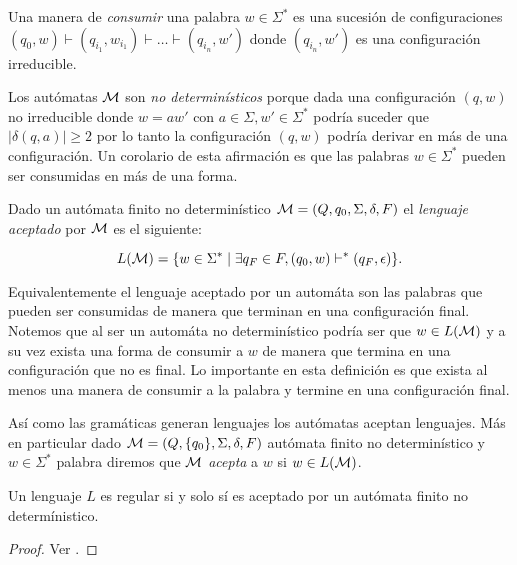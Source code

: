 \documentclass[tesis.tex]{subfiles}
\begin{document}
Una manera de \emph{consumir} una palabra $w \in \Sigma^*$ es una sucesión de configuraciones $(q_0,w) \vdash (q_{i_{1}}, w_{i_{1}}) \vdash \dots \vdash (q_{i_{n}}, w')$ donde $(q_{i_{n}}, w')$ es una configuración irreducible.

\begin{obs}
	Los autómatas $\cal M$ son \emph{no determinísticos} porque dada una configuración $(q,w)$ no irreducible donde $w = aw'$ con $a \in \Sigma, w' \in \Sigma^*$ podría suceder que $|\delta(q,a)| \ge 2$ por lo tanto la configuración $(q,w)$ podría derivar en más de una configuración.
	Un corolario de esta afirmación es que las palabras $w \in \Sigma^*$ pueden ser consumidas en más de una forma.
\end{obs}



\begin{deff}
	Dado un autómata finito no determinístico ${\cal M} = (Q,q_0,\Sigma,\delta,F)$ el \emph{lenguaje aceptado} por $\cal M$ es el siguiente:
	
	\[
	L({\cal M} ) = \{  w \in \Sigma^*\mid \exists  q_F \in F  ,  (q_0,w) \vdash^* (q_F,\epsilon)     \}.
	\]
\end{deff}
Equivalentemente el lenguaje aceptado por un automáta son las palabras que pueden ser 
consumidas de manera que terminan en una configuración final.
Notemos que al ser un automáta no determinístico podría ser que $w \in L(\cal M)$ y a su vez exista una forma de consumir a $w$ de manera que termina en una configuración que no es final.
Lo importante en esta definición es que exista al menos una manera de consumir a la palabra y termine en una configuración final.

Así como las gramáticas generan lenguajes los autómatas aceptan lenguajes.
Más en particular dado ${\cal M} = (Q,\{q_0\},\Sigma,\delta,F)$ autómata finito no determinístico y $w \in \Sigma^*$ palabra diremos que $\cal M$ \emph{acepta} a $w$ si $w \in L(\cal M)$.


\begin{teo}
	Un lenguaje $L$ es regular si y solo sí es aceptado por un autómata finito no determínistico.
\end{teo}

\begin{proof}
	Ver \cite[pp.218-219]{hopcraft-ullman}.
\end{proof}
\end{document}
